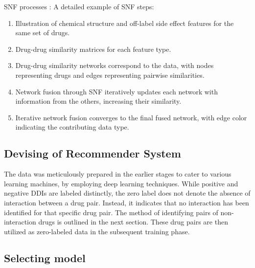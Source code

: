\documentclass[unnumsec,webpdf,contemporary,large]{oup-authoring-template}%
\theoremstyle{thmstyleone}%
\theoremstyle{thmstyletwo}%
\theoremstyle{thmstylethree}%
\begin{document}
SNF processes \cite{Wang2014}: A detailed example of SNF steps:
\begin{enumerate}
    \item Illustration of chemical structure and off-label side effect features for the same set of drugs.
\item Drug-drug similarity matrices for each feature type.
\item Drug-drug similarity networks correspond to the data, with nodes representing drugs and edges representing pairwise similarities.
\item Network fusion through SNF iteratively updates each network with information from the others, increasing their similarity.
\item Iterative network fusion converges to the final fused network, with edge color indicating the contributing data type.
\end{enumerate}
\subsection{Devising of Recommender System}
The data was meticulously prepared in the earlier stages to cater to various learning machines, by employing deep learning techniques. While positive and negative DDIs are labeled distinctly, the zero label does not denote the absence of interaction between a drug pair. Instead, it indicates that no interaction has been identified for that specific drug pair. The method of identifying pairs of non-interaction drugs is outlined in the next section. These drug pairs are then utilized as zero-labeled data in the subsequent training phase.
\subsection{Selecting model}

\end{document}
